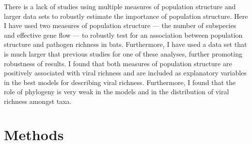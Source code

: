 There is a lack of studies using multiple measures of population structure and larger data sets to robustly estimate the importance of population structure.
Here I have used two measures of population structure --- the number of subspecies and effective gene flow --- to robustly test for an association between population structure and pathogen richness in bats.
Furthermore, I have used a data set that is much larger that previous studies for one of these analyses, further promoting robustness of results.
I found that both measures of population structure are positively associated with viral richness and are included as explanatory variables in the best models for describing viral richness.
Furthermore, I found that the role of phylogeny is very weak in the models and in the distribution of viral richness amongst taxa.



\section{Methods}



















































































